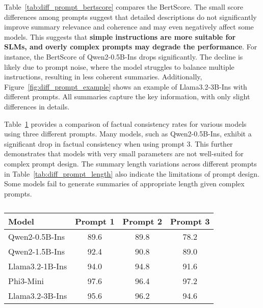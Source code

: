 Table~\ref{tab:diff_prompt_bertscore} compares the BertScore. The small score differences among prompts suggest that detailed descriptions do not significantly improve summary relevance and coherence and may even negatively affect some models. This suggests that \textbf{simple instructions are more suitable for SLMs, and overly complex prompts may degrade the performance}. For instance, the BertScore of Qwen2-0.5B-Ins drops significantly. The decline is likely due to prompt noise, where the model struggles to balance multiple instructions, resulting in less coherent summaries. Additionally, Figure~\ref{fig:diff_prompt_example} shows an example of Llama3.2-3B-Ins with different prompts. All summaries capture the key information, with only slight differences in details.



Table~\ref{tab:diff_prompt_fact} provides a comparison of factual consistency rates for various models using three different prompts. Many models, such as Qwen2-0.5B-Ins, exhibit a significant drop in factual consistency when using prompt 3. This further demonstrates that models with very small parameters are not well-suited for complex prompt design. The summary length variations across different prompts in Table~\ref{tab:diff_prompt_length} also indicate the limitations of prompt design. Some models fail to generate summaries of appropriate length given complex prompts.





\begin{table}[]
\centering
\begin{adjustbox}{max width=1\columnwidth}
\begin{tabular}{lccc}
\hline
Model & \multicolumn{1}{r}{Prompt 1} & \multicolumn{1}{r}{Prompt 2} & \multicolumn{1}{r}{Prompt 3} \\ \hline
Qwen2-0.5B-Ins  & 89.6 & 89.8  & 78.2 \\
Qwen2-1.5B-Ins  & 92.4 & 90.8  & 89.0 \\
Llama3.2-1B-Ins & 94.0 & 94.8  & 91.6 \\
Phi3-Mini       & 97.6 & 96.4  & 97.2 \\
Llama3.2-3B-Ins & 95.6 & 96.2  & 94.6 \\ \hline
\end{tabular}
\end{adjustbox}
\caption{ }
\label{tab:diff_prompt_fact}
\end{table}


